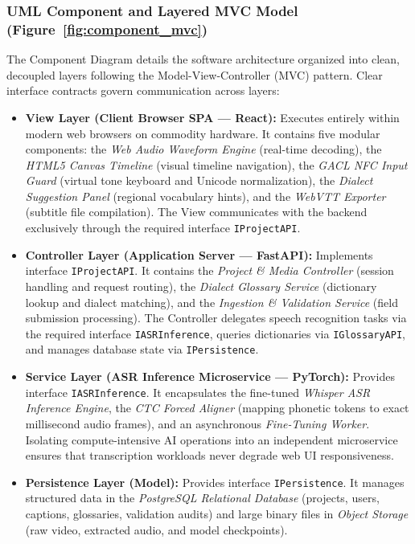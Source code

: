 \documentclass[conference]{IEEEtran}
\begin{document}
\subsubsection{UML Component and Layered MVC Model (Figure~\ref{fig:component_mvc})}
\label{sec:design:uml:component}
The Component Diagram details the software architecture organized into clean, decoupled layers following the Model-View-Controller (MVC) pattern. Clear interface contracts govern communication across layers:
\begin{itemize}
    \item \textbf{View Layer (Client Browser SPA — React):} Executes entirely within modern web browsers on commodity hardware. It contains five modular components: the \textit{Web Audio Waveform Engine} (real-time decoding), the \textit{HTML5 Canvas Timeline} (visual timeline navigation), the \textit{GACL NFC Input Guard} (virtual tone keyboard and Unicode normalization), the \textit{Dialect Suggestion Panel} (regional vocabulary hints), and the \textit{WebVTT Exporter} (subtitle file compilation). The View communicates with the backend exclusively through the required interface \texttt{IProjectAPI}.
    \item \textbf{Controller Layer (Application Server — FastAPI):} Implements interface \texttt{IProjectAPI}. It contains the \textit{Project \& Media Controller} (session handling and request routing), the \textit{Dialect Glossary Service} (dictionary lookup and dialect matching), and the \textit{Ingestion \& Validation Service} (field submission processing). The Controller delegates speech recognition tasks via the required interface \texttt{IASRInference}, queries dictionaries via \texttt{IGlossaryAPI}, and manages database state via \texttt{IPersistence}.
    \item \textbf{Service Layer (ASR Inference Microservice — PyTorch):} Provides interface \texttt{IASRInference}. It encapsulates the fine-tuned \textit{Whisper ASR Inference Engine}, the \textit{CTC Forced Aligner} (mapping phonetic tokens to exact millisecond audio frames), and an asynchronous \textit{Fine-Tuning Worker}. Isolating compute-intensive AI operations into an independent microservice ensures that transcription workloads never degrade web UI responsiveness.
    \item \textbf{Persistence Layer (Model):} Provides interface \texttt{IPersistence}. It manages structured data in the \textit{PostgreSQL Relational Database} (projects, users, captions, glossaries, validation audits) and large binary files in \textit{Object Storage} (raw video, extracted audio, and model checkpoints).
\end{itemize}
\end{document}
